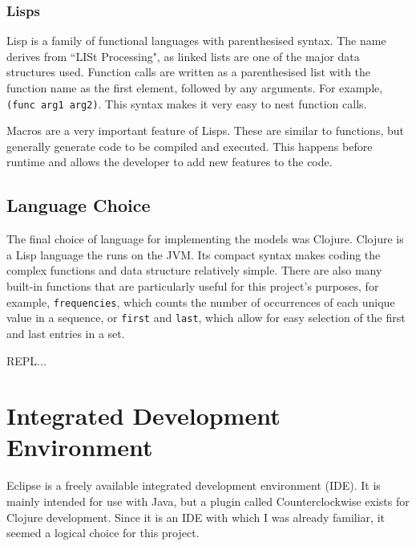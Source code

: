 
\subsubsection{Lisps}

Lisp is a family of functional languages with parenthesised syntax. The name derives from ``LISt Processing", as linked lists are one of the major data structures used. Function calls are written as a parenthesised list with the function name as the first element, followed by any arguments. For example, \lstinline!(func arg1 arg2)!. This syntax makes it very easy to nest function calls.

Macros are a very important feature of Lisps. These are similar to functions, but generally generate code to be compiled and executed. This happens before runtime and allows the developer to add new features to the code.


\subsection{Language Choice}

The final choice of language for implementing the models was Clojure. Clojure is a Lisp language the runs on the JVM. Its compact syntax makes coding the complex functions and data structure relatively simple. There are also many  built-in functions that are particularly useful for this project's purposes, for example, \lstinline!frequencies!, which counts the number of occurrences of each unique value in a sequence, or \lstinline!first! and \lstinline!last!, which allow for easy selection of the first and last entries in a set.

REPL...



\section{Integrated Development Environment}

Eclipse is a freely available integrated development environment (IDE). It is mainly intended for use with Java, but a plugin called Counterclockwise exists for Clojure development. Since it is an IDE with which I was already familiar, it seemed a logical choice for this project. 

